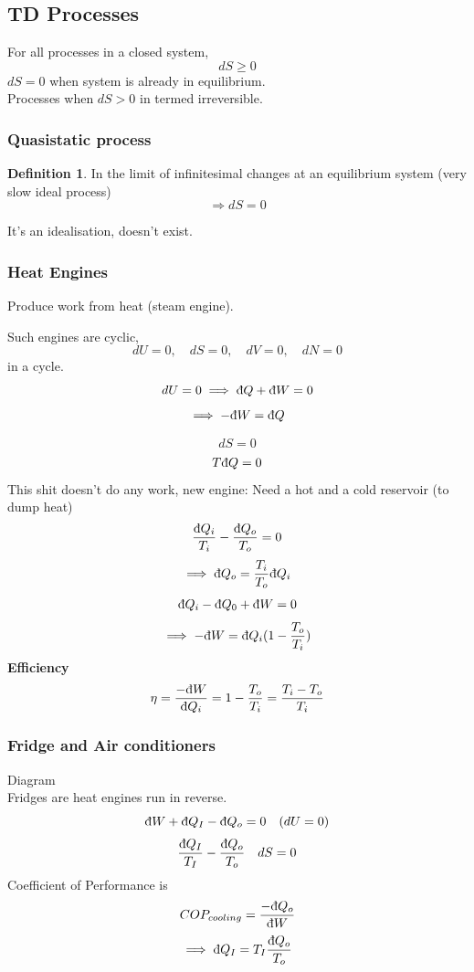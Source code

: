 \documentclass[11pt]{article}
\theoremstyle{definition}
\newtheorem{defn}{Definition}[section]
\begin{document}
\subsection{TD Processes}
For all processes in a closed system, \[ dS \geq 0 \] 
$dS = 0 $ when system is already in equilibrium. \\
Processes when $ dS > 0 $ in termed irreversible.
\subsubsection{Quasistatic process}%
\label{ssub:Quasistaticprocess}
\begin{defn}
	In the limit of infinitesimal changes at an equilibrium system (very slow ideal process)
	\[ \Rightarrow dS = 0 \] 
	
\end{defn}
It's an idealisation, doesn't exist.

\subsubsection{Heat Engines}%
\label{ssub:HeatEngines}
Produce work from heat (steam engine).

Such engines are cyclic, 
\[ dU = 0, \quad dS = 0, \quad  dV = 0, \quad dN = 0\] in a cycle.
\[ dU = 0 \implies \text{\dj} Q + \text{\dj} W = 0 \] 
\[ \implies - \text{\dj} W = \text{\dj} Q \] 

\[ dS = 0 \] 
\[ T \text{\dj} Q = 0 \] 
This shit doesn't do any work, new engine:
Need a hot and a cold reservoir (to dump heat)
\[ \frac{\text{\dj} Q_i}{T_i} - \frac{ \text{\dj} Q_o}{T_o} = 0 \] 
\[ \implies \text{\dj} Q_o = \frac{T_i}{T_o} \text{\dj} Q_i \] 
\[ \text{\dj} Q_i - \text{\dj} Q_0 +\text{\dj} W  = 0\] 
\[ \implies -\text{\dj} W = \text{\dj} Q_i (1-\frac{T_o}{T_i}) \] 
\textbf{Efficiency} 
\[ \eta = \frac{-\text{\dj} W}{\text{\dj} Q_i} = 1 - \frac{T_o}{T_i} = \frac{T_i - T_o}{T_i} \] 

\subsubsection{Fridge and Air conditioners}%
\label{ssub:Fridge and Air conditioners}

Diagram\\
Fridges are heat engines run in reverse.
\[ \text{\dj}W + \text{\dj}Q_I - \text{\dj}Q_o = 0 \quad (dU = 0)\] 
\[ \frac{ \text{\dj} Q_I }{T_I} - \frac{ \text{\dj}Q_o }{T_o} \quad dS=0 \] 
Coefficient of Performance is 
\[ COP_{cooling} = \frac{- \text{\dj}Q_o}{ \text{\dj}W }\] 
\[ \implies \text{\dj}Q_I = T_I \frac{ \text{\dj}Q_o }{T_o} \] 
\end{document}
